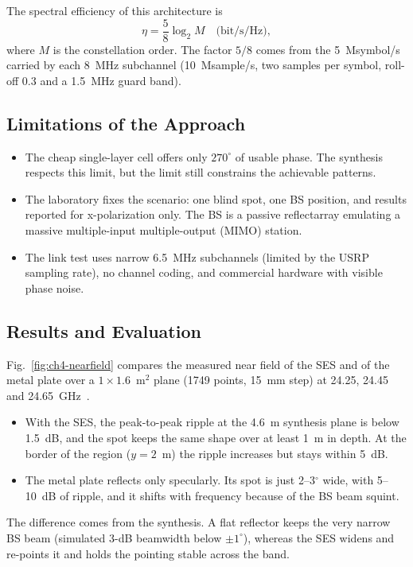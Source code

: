 The spectral efficiency of this architecture is~\cite{Vaquero2026}
\begin{equation}\label{eq:ch4-se}
\eta = \frac{5}{8}\log_2 M \quad \text{(bit/s/Hz)},
\end{equation}
where $M$ is the constellation order. The factor $5/8$ comes from the 5~Msymbol/s carried by each 8~MHz subchannel (10~Msample/s, two samples per symbol, roll-off 0.3 and a 1.5~MHz guard band).

\subsection{Limitations of the Approach}
\begin{itemize}
    \item The cheap single-layer cell offers only $270^\circ$ of usable phase. The synthesis respects this limit, but the limit still constrains the achievable patterns.
    \item The laboratory fixes the scenario: one blind spot, one BS position, and results reported for x-polarization only. The BS is a passive reflectarray emulating a massive multiple-input multiple-output (MIMO) station.
    \item The link test uses narrow 6.5~MHz subchannels (limited by the USRP sampling rate), no channel coding, and commercial hardware with visible phase noise.
\end{itemize}

\subsection{Results and Evaluation}
Fig.~\ref{fig:ch4-nearfield} compares the measured near field of the SES and of the metal plate over a $1 \times 1.6$~m$^2$ plane (1749 points, 15~mm step) at 24.25, 24.45 and 24.65~GHz~\cite{Vaquero2026}.
\begin{itemize}
    \item With the SES, the peak-to-peak ripple at the 4.6~m synthesis plane is below 1.5~dB, and the spot keeps the same shape over at least 1~m in depth. At the border of the region ($y = 2$~m) the ripple increases but stays within 5~dB.
    \item The metal plate reflects only specularly. Its spot is just 2--3$^\circ$ wide, with 5--10~dB of ripple, and it shifts with frequency because of the BS beam squint.
\end{itemize}
The difference comes from the synthesis. A flat reflector keeps the very narrow BS beam (simulated 3-dB beamwidth below $\pm 1^\circ$), whereas the SES widens and re-points it and holds the pointing stable across the band.


